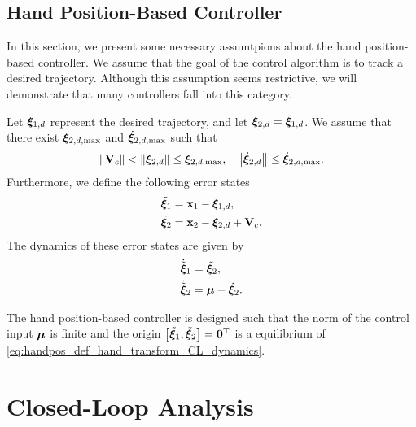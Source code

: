\subsection{Hand Position-Based Controller}
In this section, we present some necessary assumtpions about the hand position-based controller.
We assume that the goal of the control algorithm is to track a desired trajectory.
Although this assumption seems restrictive, we will demonstrate that many controllers fall into this category.

Let $\bm{\xi}_{1, d}$ represent the desired trajectory, and let $\bm{\xi}_{2, d} = \dot{\bm{\xi}}_{1, d}$.
We assume that there exist $\bm{\xi}_{2, d, \max}$ and $\dot{\bm{\xi}}_{2, d, \max}$ such that
\begin{align}
    \left\|\mathbf{V}_c\right\| &< \left\|\bm{\xi}_{2, d}\right\| \leq \bm{\xi}_{2, d, \max}, &
    \left\|\dot{\bm{\xi}}_{2, d}\right\| \leq \dot{\bm{\xi}}_{2, d, \max}.
\end{align}
Furthermore, we define the following error states
\begin{subequations}
    \begin{align}
        \tilde{\bm{\xi}}_1 &= \mathbf{x}_1 - \bm{\xi}_{1, d}, \\
        \tilde{\bm{\xi}}_2 &= \mathbf{x}_2 - \bm{\xi}_{2, d} + \mathbf{V}_c.
    \end{align} \label{eq:handpos_def_hand_transform_CL}
\end{subequations}
The dynamics of these error states are given by
\begin{subequations}
    \begin{align}
        \dot{\tilde{\bm{\xi}}}_1 &= \tilde{\bm{\xi}}_2, \\
        \dot{\tilde{\bm{\xi}}}_2 &= \bm{\mu} - \dot{\bm{\xi}}_2.
    \end{align} \label{eq:handpos_def_hand_transform_CL_dynamics}
\end{subequations}

\begin{asm}
    The hand position-based controller is designed such that the norm of the control input $\bm{\mu}$ is finite and the origin $\left[\tilde{\bm{\xi}}_1, \tilde{\bm{\xi}}_2\right] = \mathbf{0}^{\mathrm{T}}$ is a  equilibrium of \eqref{eq:handpos_def_hand_transform_CL_dynamics}.
\end{asm}

\section{Closed-Loop Analysis}
\label{sec:handpos_def_closed_loop_analysis}

